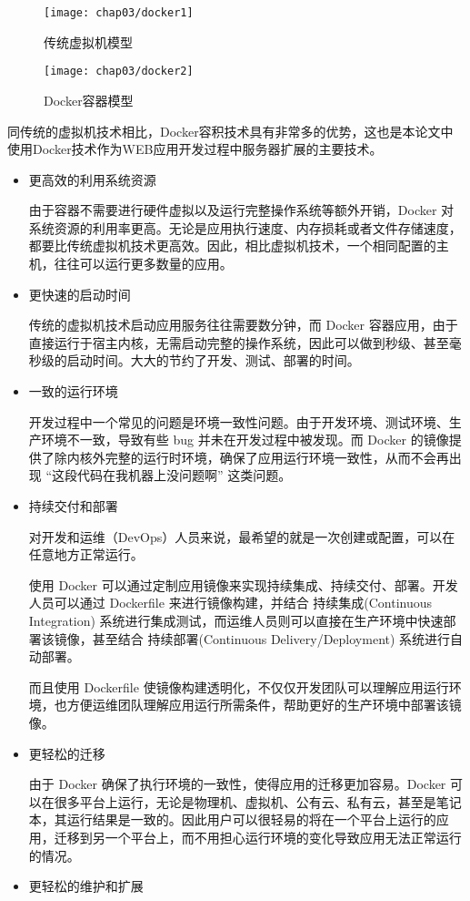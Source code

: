 \begin{figure}[H] %
  \centering
  \texttt{[image: chap03/docker1]}
  \caption{传统虚拟机模型}
  \label{fig:docker1}
\end{figure}
\begin{figure}[H] %
  \centering
  \texttt{[image: chap03/docker2]}
  \caption{Docker容器模型}
  \label{fig:docker2}
\end{figure}
同传统的虚拟机技术相比，Docker容积技术具有非常多的优势，这也是本论文中使用Docker技术作为WEB应用开发过程中服务器扩展的主要技术。
\begin{itemize}
\item 更高效的利用系统资源

由于容器不需要进行硬件虚拟以及运行完整操作系统等额外开销，Docker 对系统资源的利用率更高。无论是应用执行速度、内存损耗或者文件存储速度，都要比传统虚拟机技术更高效。因此，相比虚拟机技术，一个相同配置的主机，往往可以运行更多数量的应用。
\item 更快速的启动时间

传统的虚拟机技术启动应用服务往往需要数分钟，而 Docker 容器应用，由于直接运行于宿主内核，无需启动完整的操作系统，因此可以做到秒级、甚至毫秒级的启动时间。大大的节约了开发、测试、部署的时间。
\item 一致的运行环境

开发过程中一个常见的问题是环境一致性问题。由于开发环境、测试环境、生产环境不一致，导致有些 bug 并未在开发过程中被发现。而 Docker 的镜像提供了除内核外完整的运行时环境，确保了应用运行环境一致性，从而不会再出现 “这段代码在我机器上没问题啊” 这类问题。
\item 持续交付和部署

对开发和运维（DevOps）人员来说，最希望的就是一次创建或配置，可以在任意地方正常运行。

使用 Docker 可以通过定制应用镜像来实现持续集成、持续交付、部署。开发人员可以通过 Dockerfile 来进行镜像构建，并结合 持续集成(Continuous Integration) 系统进行集成测试，而运维人员则可以直接在生产环境中快速部署该镜像，甚至结合 持续部署(Continuous Delivery/Deployment) 系统进行自动部署。

而且使用 Dockerfile 使镜像构建透明化，不仅仅开发团队可以理解应用运行环境，也方便运维团队理解应用运行所需条件，帮助更好的生产环境中部署该镜像。
\item 更轻松的迁移

由于 Docker 确保了执行环境的一致性，使得应用的迁移更加容易。Docker 可以在很多平台上运行，无论是物理机、虚拟机、公有云、私有云，甚至是笔记本，其运行结果是一致的。因此用户可以很轻易的将在一个平台上运行的应用，迁移到另一个平台上，而不用担心运行环境的变化导致应用无法正常运行的情况。
\item 更轻松的维护和扩展


\end{itemize}
